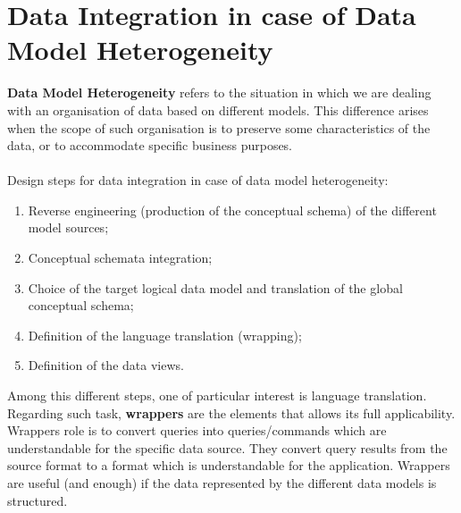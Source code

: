 \documentclass[10pt,a4paper]{article}
\newcommand{\nline}{\\~\\}
\begin{document}
\section{Data Integration in case of Data Model Heterogeneity}
\begin{justify}
\textbf{Data Model Heterogeneity} refers to the situation in which we are dealing with an organisation of data based on different models. This difference arises when the scope of such organisation is to preserve some characteristics of the data, or to accommodate specific business purposes.
 \nline
 Design steps for data integration in case of data model heterogeneity:
\begin{enumerate}
	\item Reverse engineering (production of the conceptual schema) of the different model sources;
	\item Conceptual schemata integration;
	\item Choice of the target logical data model and translation of the global conceptual schema; 
	\item Definition of the language translation (wrapping);
	\item Definition of the data views.
\end{enumerate}
Among this different steps, one of particular interest is language translation. Regarding such task, \textbf{wrappers} are the elements that allows its full applicability. Wrappers role is to convert queries into queries/commands which are understandable for the specific data source. They convert query results from the source format to a format which is understandable for the application. Wrappers are useful (and enough) if the data represented by the different data models is structured.
\end{justify}
\end{document}

